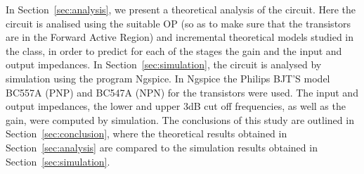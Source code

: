 In Section~\ref{sec:analysis}, we present a theoretical analysis of the circuit. Here the circuit is analised using the suitable OP (so as to make sure that the transistors are in the Forward Active Region) and incremental theoretical models studied in the class, in order to predict for each of the stages the gain and the input and output impedances.
In Section~\ref{sec:simulation}, the circuit is analysed by
simulation using the program Ngspice. In Ngspice the Philips BJT'S model BC557A (PNP) and BC547A (NPN) for the transistors were used. The input and output impedances, the lower and upper 3dB cut off frequencies, as well as the gain, were computed by simulation. The conclusions of this study are outlined in
Section~\ref{sec:conclusion}, where the theoretical results obtained in
Section~\ref{sec:analysis} are compared to the simulation results obtained in
Section~\ref{sec:simulation}.





\pagebreak

